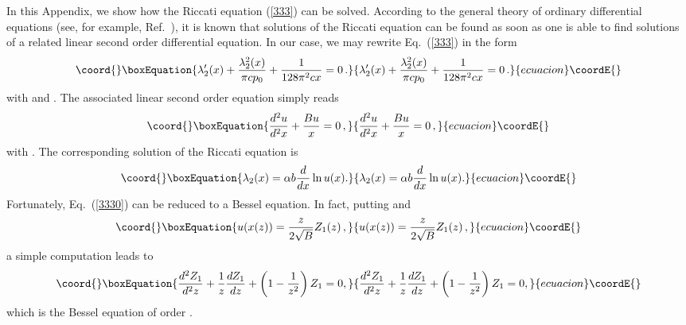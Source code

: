 \documentclass[a4paper,aps,prl,preprint,groupedaddress,showpacs,nobibnotes,tightenlines]{revtex4}
\begin{document}
In this Appendix, we show how the Riccati equation (\ref{333}) can be solved.
According to the general theory of ordinary differential equations 
(see, for example, Ref.~\cite{ince}), it is 
known that  solutions of  
the Riccati equation can be found as soon as one is able to find solutions 
of a related  linear second order differential equation. In our case,
we may rewrite Eq.~(\ref{333}) in the form
\begin{equation}\coord{}\boxEquation{
\lambda_2'(x)+\frac{\lambda_2^2(x)}{\pi c p_0}+\frac{1}{128\pi^2c x}=0\,.
}{
\lambda_2'(x)+\frac{\lambda_2^2(x)}{\pi c p_0}+\frac{1}{128\pi^2c x}=0\,.
}{ecuacion}\coordE{}\end{equation}
with \coordHE{} and \coordHE{}. The associated linear 
second order equation simply  reads
\begin{equation}\coord{}\boxEquation{
\frac{d^2 u}{d^2 x}+
\frac{B u}{x}=0\,,
\label{3330}
}{
\frac{d^2 u}{d^2 x}+
\frac{B u}{x}=0\,,
}{ecuacion}\coordE{}\end{equation}
with  \coordHE{}.  The corresponding  
solution of the Riccati equation is  
\begin{equation}\coord{}\boxEquation{
\lambda_2(x)=\alpha b{d\over dx}\ln u(x).
\label{lambdainu}
}{
\lambda_2(x)=\alpha b{d\over dx}\ln u(x).
}{ecuacion}\coordE{}\end{equation}
 Fortunately, Eq.~(\ref{3330})
can be reduced to a Bessel equation. In fact,  putting \coordHE{}
and
\begin{equation}\coord{}\boxEquation{
u(x(z))=\frac{z}{2\sqrt{B }}Z_1(z)\,,
\label{Z}
}{
u(x(z))=\frac{z}{2\sqrt{B }}Z_1(z)\,,
}{ecuacion}\coordE{}\end{equation}
a simple computation leads to 
\begin{equation}\coord{}\boxEquation{
\frac{d^2 Z_1}{d^2z}+\frac{1}{z}\frac{d Z_1}{dz}
+\left(1-\frac{1}{z^2}\right)Z_1=0,
\label{bf}
}{
\frac{d^2 Z_1}{d^2z}+\frac{1}{z}\frac{d Z_1}{dz}
+\left(1-\frac{1}{z^2}\right)Z_1=0,
}{ecuacion}\coordE{}\end{equation}
which is the Bessel equation of order \coordHE{}. 
\end{document}
